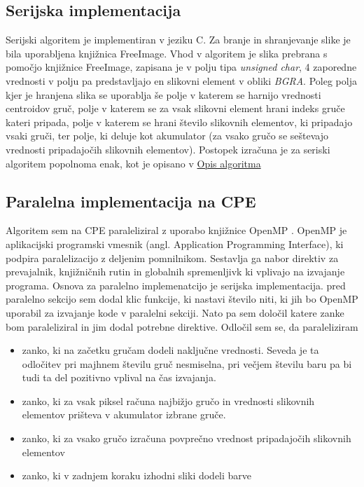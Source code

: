 \documentclass[11pt]{article}
\begin{document}
\subsection{Serijska implementacija}
Serijski algoritem je implementiran v jeziku C. Za branje in shranjevanje slike je bila uporabljena knjižnica FreeImage\cite{FreeImage}.
Vhod v algoritem je slika prebrana s pomočjo knjižnice FreeImage, zapisana je v polju tipa \emph{unsigned char}, 4 zaporedne vrednosti v polju pa predstavljajo en slikovni element v obliki \emph{BGRA}.
Poleg polja kjer je hranjena slika se uporablja še polje v katerem se harnijo vrednosti centroidov gruč,
polje v katerem se za vsak slikovni element hrani indeks gruče kateri pripada,
polje v katerem se hrani število slikovnih elementov, ki pripadajo vsaki gruči,
ter polje, ki deluje kot akumulator (za vsako gručo se seštevajo vrednosti pripadajočih slikovnih elementov).
Postopek izračuna je za seriski algoritem popolnoma enak, kot je opisano v \hyperref[sec:algorithm]{Opis algoritma}

\subsection{Paralelna implementacija na CPE}
Algoritem sem na CPE paraleliziral z uporabo knjižnice OpenMP \cite{OMP}.
OpenMP je aplikacijski programski vmesnik (angl. Application Programming Interface), ki podpira paralelizacijo z deljenim pomnilnikom. Sestavlja ga nabor direktiv za prevajalnik, knjižničnih rutin  in globalnih spremenljivk ki vplivajo na izvajanje programa.
Osnova za paralelno implemenatcijo je serijska implementacija. pred paralelno sekcijo sem dodal klic funkcije, ki nastavi število niti, ki jih bo OpenMP uporabil za izvajanje kode v paralelni sekciji.
Nato pa sem določil katere zanke bom paraleliziral in jim dodal potrebne direktive.
Odločil sem se, da paraleliziram
\begin{itemize}
    \item zanko, ki na začetku gručam dodeli naključne vrednosti. Seveda je ta odločitev pri majhnem številu gruč nesmiselna, pri večjem številu baru pa bi tudi ta del pozitivno vplival na čas izvajanja.
    \item zanko, ki za vsak piksel računa najbižjo gručo in vrednosti slikovnih elementov prišteva v akumulator izbrane gruče.
    \item zanko, ki za vsako gručo izračuna povprečno vrednost pripadajočih slikovnih elementov
    \item zanko, ki v zadnjem koraku izhodni sliki dodeli barve
\end{itemize}
\end{document}
